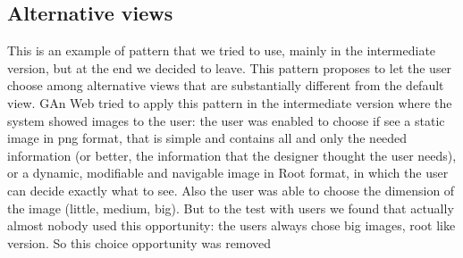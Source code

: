 \subsection{Alternative views}
This is an example of pattern that we tried to use, mainly in the intermediate version, but at the end we decided to leave. 
This pattern proposes to let the user choose among alternative views that are substantially different from the default view. 
GAn Web tried to apply this pattern in the intermediate version where the system showed images to the user: the user was enabled to choose if see a static image in png format, that is simple and contains all and only the needed information (or better, the information that the designer thought the user needs), or a dynamic, modifiable and navigable image in Root format, in which the user can decide exactly what to see. Also the user was able to choose the dimension of the image (little, medium, big). But to the test with users we found that actually almost nobody used this opportunity: the users always chose big images, root like version. So this choice opportunity was removed


 